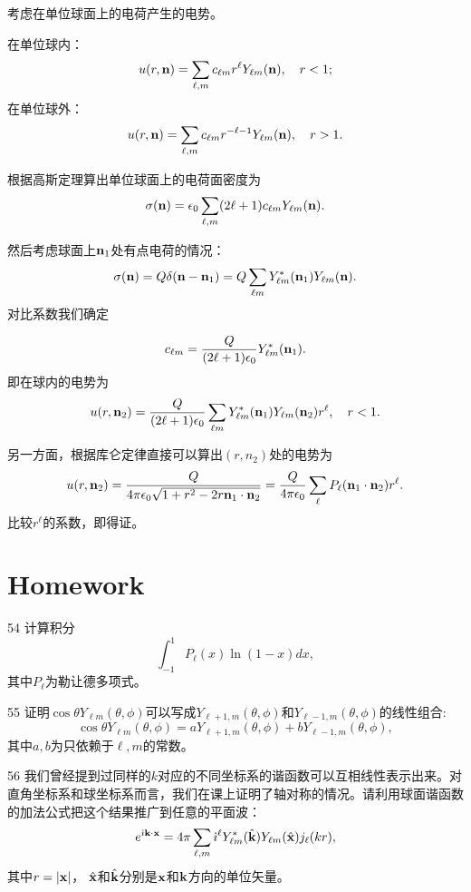 \documentclass[CJK]{beamer}
\begin{document}
\begin{frame}
  \bch
  考虑在单位球面上的电荷产生的电势。

  在单位球内：
  $$ u(r, {\mathbf{n}}) = \sum_{\ell,m}c_{\ell m}r^\ell Y_{\ell m}({\mathbf{n}}),\ \ \ r<1 ;$$
  在单位球外：
  $$ u(r, {\mathbf{n}}) = \sum_{\ell,m}c_{\ell m}r^{-\ell-1} Y_{\ell m}({\mathbf{n}}),\ \ \ r>1 .$$
  
  根据高斯定理算出单位球面上的电荷面密度为
  $$\sigma({\mathbf{n}}) = \epsilon_0 \sum_{\ell,m}(2\ell+1)c_{\ell m}Y_{\ell m}({\mathbf{n}}).$$
  \ech
\end{frame}


\begin{frame}
  \bch
  然后考虑球面上${\mathbf{n}}_1$处有点电荷的情况：
  $$\sigma({\mathbf{n}}) = Q \delta({\mathbf{n}}-{\mathbf{n}}_1) = Q\sum_{\ell m}Y_{\ell m}^*({\mathbf{n}}_1)Y_{\ell m}({\mathbf{n}}).$$
  对比系数我们确定
  
  $$ c_{\ell m} = \frac{Q}{(2\ell+1)\epsilon_0}  Y_{\ell m}^*({\mathbf{n}}_1). $$
  即在球内的电势为
  $$ u(r,{\mathbf{n}}_2)= \frac{Q}{(2\ell+1)\epsilon_0} \sum_{\ell m} Y_{\ell m}^*({\mathbf{n}}_1)Y_{\ell m}({\mathbf{n}}_2)r^\ell,  \ \ \ r<1. $$
  \ech
\end{frame}

\begin{frame}
  \bch
  另一方面，根据库仑定律直接可以算出$(r, n_2)$处的电势为
  $$u(r,{\mathbf{n}}_2) = \frac{Q}{4\pi\epsilon_0\sqrt{1+r^2-2r{\mathbf{n}}_1\cdot{\mathbf{n}}_2}} = \frac{Q}{4\pi\epsilon_0}\sum_{\ell}P_\ell({\mathbf{n}}_1\cdot{\mathbf{n}}_2) r^\ell .$$
  比较$r^\ell$的系数，即得证。
  \ech
\end{frame}


\section{Homework}



\begin{frame}
\bch
\bitem
\item[54]{计算积分
  $$\int_{-1}^1 P_\ell(x)\ln(1-x)dx, $$
其中$P_\ell$为勒让德多项式。}
\item[55]{证明$\cos\theta Y_{\ell m}(\theta,\phi)$可以写成$Y_{\ell+1,m}(\theta,\phi)$和$Y_{\ell-1,m}(\theta,\phi)$的线性组合:
  $$ \cos\theta Y_{\ell m}(\theta,\phi) = a Y_{\ell+1,m}(\theta,\phi)+ b Y_{\ell-1,m}(\theta,\phi), $$
  其中$a, b$为只依赖于$\ell, m$的常数。
}
\eitem
\ech
\end{frame}


\begin{frame}
\bch
\bitem
\item[56]{我们曾经提到过同样的$k$对应的不同坐标系的谐函数可以互相线性表示出来。对直角坐标系和球坐标系而言，我们在课上证明了轴对称的情况。请利用球面谐函数的加法公式把这个结果推广到任意的平面波：
  $$ e^{{\dot{\imath}} {\mathbf{k}}\cdot{\mathbf{x}}} = 4\pi \sum_{\ell, m}{\dot{\imath}}^\ell Y_{\ell m}^*(\hat{{\mathbf{k}}})Y_{\ell m}(\hat{{\mathbf{x}}})j_{\ell}(kr),$$
其中$r=|{\mathbf{x}}|$， $\hat{{\mathbf{x}}}$和$\hat{{\mathbf{k}}}$分别是${\mathbf{x}}$和${\mathbf{k}}$方向的单位矢量。}
\eitem
\ech
\end{frame}
\end{document}
